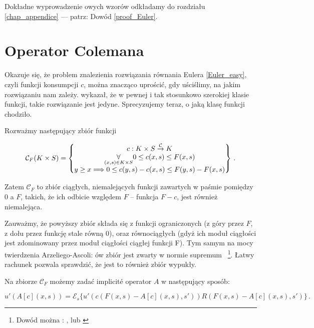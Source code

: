 Dokładne wyprowadzenie owych wzorów odkładamy do rozdziału \ref{chap_appendice} --- patrz: Dowód \ref{proof_Euler}.



\section{Operator Colemana}\label{section_Coleman_operator}

Okazuje się, że problem znalezienia rozwiązania równania Eulera \ref{Euler_easy}, czyli funkcji konsumpcji $ c $, można znacząco uprościć, gdy uściślimy, na jakim rozwiązaniu nam zależy. \citet{Coleman1, Coleman2} wykazał, że w pewnej i tak stosunkowo szerokiej klasie funkcji, takie rozwiązanie jest jedyne. Sprecyzujemy teraz, o jaką klasę funkcji chodziło.

Rozważmy następujący zbiór funkcji

\begin{equation}\label{C_F}
\mathcal{C}_{F}(K \times S) = \left \{ \begin{matrix}
c: K \times S \overset{\mathcal{C}}{\rightarrow} K \cr
 \underset{(x,s)\in K\times S}{\forall}0 \leq c(x,s) \leq F(x,s) \cr
 y \geq x \Longrightarrow 0 \leq c(y,s)-c(x,s)\leq F(y,s) - F(x,s)  	\cr 
\end{matrix} \right \}\,.
\end{equation}  

Zatem $ \mathcal{C}_{F} $ to zbiór ciągłych, niemalejących funkcji zawartych w paśmie pomiędzy $ 0 $ a $ F $, takich, że ich odbicie względem $ F $ -- funkcja $ F-c $, jest również niemalejąca.

Zauważmy, że powyższy zbiór składa się z funkcji ograniczonych (z góry przez $ F $, z dołu przez funkcję stale równą $ 0 $), oraz równociągłych (gdyż ich moduł ciągłości jest zdominowany przez moduł ciągłości ciągłej funkcji F). Tym samym na mocy twierdzenia Arzeliego-Ascoli: ów zbiór jest zwarty w normie supremum ~\footnote{Dowód można : \citet[][str. 411]{Rudin}, lub \citet[][str. 194]{Engelking}}. Łatwy rachunek pozwala sprawdzić, że jest to również zbiór wypukły. 

Na zbiorze $ \mathcal{C}_{F} $ możemy zadać implicit\'e operator $ A $ w następujący sposób:

\begin{equation}\label{def A}
u'(A[c](x,s)) =   \mathcal{E}_s \bigl \{ u'(c(F(x,s)-A[c](x,s),s'))R(F(x,s)-A[c](x,s),s')	\bigl \}\,. 
\end{equation}

